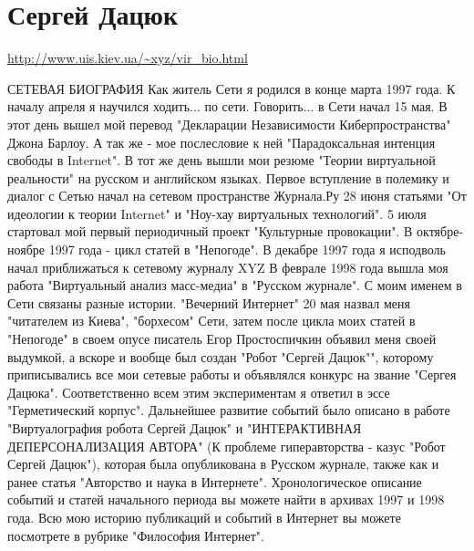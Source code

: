  
 
 
 
 
\section{Сергей Дацюк}
\label{sec:people.dacjuk_sergej_filosof}

\url{http://www.uis.kiev.ua/~xyz/vir_bio.html}

СЕТЕВАЯ БИОГРАФИЯ
Как житель Сети я родился в конце марта 1997 года. К началу апреля я научился ходить... по сети. Говорить... в Сети начал 15 мая. В этот день вышел мой перевод "Декларации Независимости Киберпространства" Джона Барлоу. А так же - мое послесловие к ней "Парадоксальная интенция свободы в Internet". В тот же день вышли мои резюме "Теории виртуальной реальности" на русском и английском языках.
Первое вступление в полемику и диалог с Сетью начал на сетевом пространстве Журнала.Ру 28 июня статьями "От идеологии к теории Internet" и "Ноу-хау виртуальных технологий".
5 июля стартовал мой первый периодичный проект "Культурные провокации".
В октябре-ноябре 1997 года - цикл статей в "Непогоде".
В декабре 1997 года я исподволь начал приближаться к сетевому журналу XYZ
В феврале 1998 года вышла моя работа "Виртуальный анализ масс-медиа" в "Русском журнале".
С моим именем в Сети связаны разные истории. "Вечерний Интернет" 20 мая назвал меня "читателем из Киева", "борхесом" Сети, затем после цикла моих статей в "Непогоде" в своем опусе писатель Егор Простоспичкин объявил меня своей выдумкой, а вскоре и вообще был создан "Робот "Сергей Дацюк"", которому приписывались все мои сетевые работы и объявлялся конкурс на звание "Сергея Дацюка". Соответственно всем этим экспериментам я ответил в эссе "Герметический корпус". Дальнейшее развитие событий было описано в работе "Виртуалография робота Сергей Дацюк" и "ИНТЕРАКТИВНАЯ ДЕПЕРСОНАЛИЗАЦИЯ АВТОРА" (К проблеме гиперавторства - казус "Робот Сергей Дацюк"), которая была опубликована в Русском журнале, также как и ранее статья "Авторство и наука в Интернете".
Хронологическое описание событий и статей начального периода вы можете найти в архивах 1997 и 1998 года.
Всю мою историю публикаций и событий в Интернет вы можете посмотрете в рубрике "Философия Интернет".
